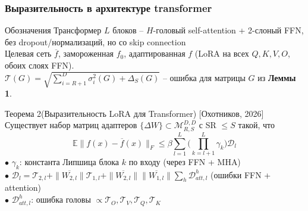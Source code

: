 \documentclass[10pt]{beamer}
\begin{document}
\begin{frame}
    \frametitle{Выразительность в архитектуре transformer}
    \vspace{-0.3cm}
    \begin{block}{Обозначения}
        Трансформер $L$ блоков -- $H$-головый self-attention + 2-слоный FFN, без dropout/нормализаций, но со skip connection \\
        Целевая сеть $\overline{f}$, замороженная $f_0$, адаптированная $f$ (LoRA на всех $Q,K,V,O$, обоих слоях FFN).\\
        $\mathcal{T}(G) = \sqrt{\sum_{i=R+1}^{D}\sigma_i^2(G) + \Delta_S(G)}$ -- ошибка для матрицы $G$ из \textbf{Леммы 1}.
    \end{block}
    \vspace{-0.2cm}
    \begin{block}{Теорема 2(Выразительность LoRA для Transformer) [Охотников, 2026]}
        \vspace{-0.2cm}
        Существует набор матриц адаптеров $\{\Delta W\}\subset \mathcal{M}_{R,S}^{D,D}$ с SR $\leqslant S$ такой, что
        \vspace{-0.2cm}
        $$\mathbb{E}\|f(x) - \overline{f}(x)\|_F \leqslant \beta\sum_{l=1}^{L}\Big(\prod_{k=l+1}^L \gamma_k\Big)\mathcal{D}_l$$
        $\bullet$ $\gamma_k$: константа Липшица блока $k$ по входу (через FFN + MHA)\\
        $\bullet$ $\mathcal{D}_l = \mathcal{T}_{2,l} + \|\overline{W_{2,l}}\|\mathcal{T}_{1,l} + \|\overline{W_{2,l}}\|\|\overline{W_{1,l}}\|\sum_h \mathcal{D}_{att,l}^h$ (ошибки FFN + attention)\\
        $\bullet$ $\mathcal{D}_{att,l}^h$: ошибка головы $\propto \mathcal{T}_{O},\mathcal{T}_{V},\mathcal{T}_{Q},\mathcal{T}_{K}$
    \end{block}
\end{frame}
\end{document}
